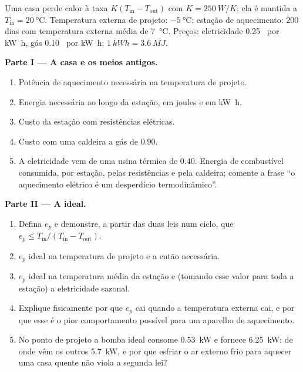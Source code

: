 \begin{problem}
\label{pb:b1:heat-engines:1}
Uma casa perde calor à taxa $K(T_{\mathrm{in}} - T_{\mathrm{out}})$ com
$K = \qty{250}{W/K}$; ela é mantida a $T_{\mathrm{in}} = \qty{20}{\degreeCelsius}$.
Temperatura externa de projeto: $\qty{-5}{\degreeCelsius}$; estação de
aquecimento: $200$ dias com temperatura externa média de \qty{7}{\degreeCelsius}.
Preços: eletricidade 0.25~\texteuro{} por \unit{kW h}, gás 0.10~\texteuro{} por
\unit{kW h}; $\qty{1}{kW h} = \qty{3.6}{MJ}$.

\medskip
\noindent\textbf{Parte I --- A casa e os meios antigos.}
\begin{enumerate}
  \item Potência de aquecimento necessária na temperatura de projeto.
  \item Energia necessária ao longo da estação, em joules e em \unit{kW h}.
  \item Custo da estação com resistências elétricas.
  \item Custo com uma caldeira a gás de  $0.90$.
  \item A eletricidade vem de uma usina térmica de 
        $0.40$. Energia de combustível consumida, por estação, pelas
        resistências e pela caldeira; comente a frase ``o aquecimento
        elétrico é um desperdício termodinâmico''.
\end{enumerate}

\medskip
\noindent\textbf{Parte II --- A  ideal.}
\begin{enumerate}[resume]
  \item Defina $e_p$ e demonstre, a partir das duas leis num ciclo, que
        $e_p \leq T_{\mathrm{in}}/(T_{\mathrm{in}} - T_{\mathrm{out}})$.
  \item $e_p$ ideal na temperatura de projeto e a  então
        necessária.
  \item $e_p$ ideal na temperatura média da estação e (tomando esse valor
        para toda a estação) a eletricidade sazonal.
  \item Explique fisicamente por que $e_p$ cai quando a temperatura externa
        cai, e por que esse é o pior comportamento possível para um
        aparelho de aquecimento.
  \item No ponto de projeto a bomba ideal consome \qty{0.53}{kW} e
        fornece \qty{6.25}{kW}: de onde vêm os outros \qty{5.7}{kW}, e
        por que esfriar o ar externo frio para aquecer uma casa quente
        não viola a segunda lei?
\end{enumerate}


\end{problem}
